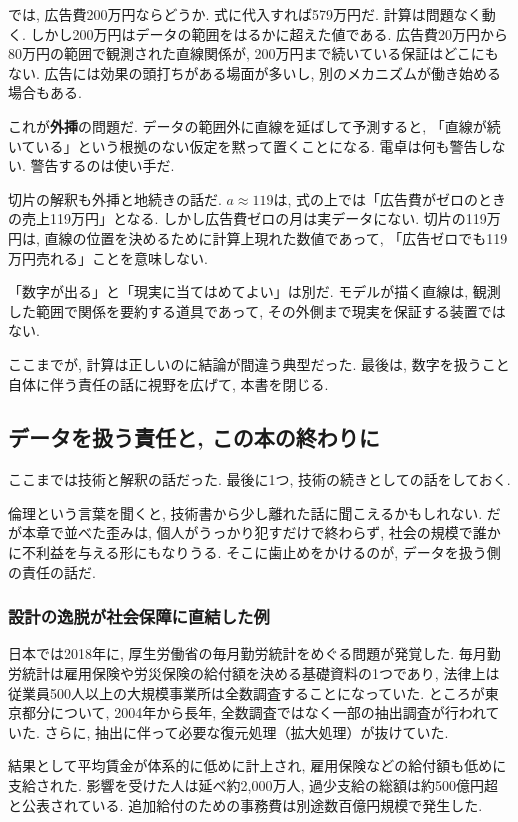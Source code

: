 では, 広告費200万円ならどうか.
式に代入すれば579万円だ. 計算は問題なく動く.
しかし200万円はデータの範囲をはるかに超えた値である.
広告費20万円から80万円の範囲で観測された直線関係が, 200万円まで続いている保証はどこにもない.
広告には効果の頭打ちがある場面が多いし, 別のメカニズムが働き始める場合もある.

これが\textbf{外挿}の問題だ.
データの範囲外に直線を延ばして予測すると, 「直線が続いている」という根拠のない仮定を黙って置くことになる.
電卓は何も警告しない. 警告するのは使い手だ.

切片の解釈も外挿と地続きの話だ.
$a \approx 119$は, 式の上では「広告費がゼロのときの売上119万円」となる.
しかし広告費ゼロの月は実データにない.
切片の119万円は, 直線の位置を決めるために計算上現れた数値であって, 「広告ゼロでも119万円売れる」ことを意味しない.

「数字が出る」と「現実に当てはめてよい」は別だ.
モデルが描く直線は, 観測した範囲で関係を要約する道具であって, その外側まで現実を保証する装置ではない.

ここまでが, 計算は正しいのに結論が間違う典型だった.
最後は, 数字を扱うこと自体に伴う責任の話に視野を広げて, 本書を閉じる.


\subsection{データを扱う責任と, この本の終わりに}

ここまでは技術と解釈の話だった.
最後に1つ, 技術の続きとしての話をしておく.

倫理という言葉を聞くと, 技術書から少し離れた話に聞こえるかもしれない.
だが本章で並べた歪みは, 個人がうっかり犯すだけで終わらず, 社会の規模で誰かに不利益を与える形にもなりうる.
そこに歯止めをかけるのが, データを扱う側の責任の話だ.

\subsubsection*{設計の逸脱が社会保障に直結した例}

日本では2018年に, 厚生労働省の毎月勤労統計をめぐる問題が発覚した.
毎月勤労統計は雇用保険や労災保険の給付額を決める基礎資料の1つであり, 法律上は従業員500人以上の大規模事業所は全数調査することになっていた.
ところが東京都分について, 2004年から長年, 全数調査ではなく一部の抽出調査が行われていた.
さらに, 抽出に伴って必要な復元処理（拡大処理）が抜けていた.

結果として平均賃金が体系的に低めに計上され, 雇用保険などの給付額も低めに支給された.
影響を受けた人は延べ約2{,}000万人, 過少支給の総額は約500億円超と公表されている.
追加給付のための事務費は別途数百億円規模で発生した.

